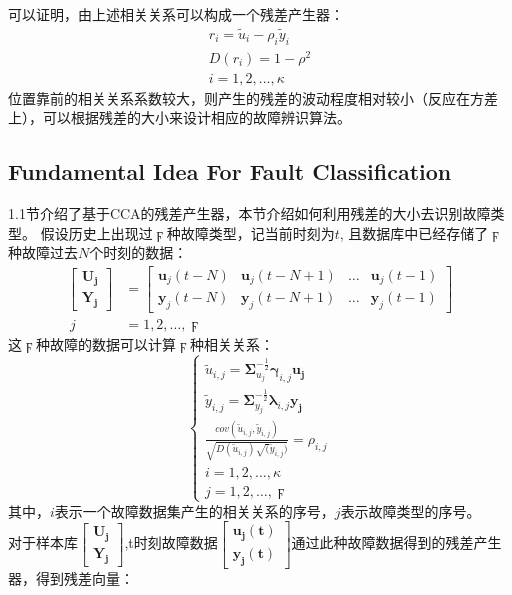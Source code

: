 \documentclass[lang=cn,11pt,a4paper]{elegantpaper}
\begin{document}
可以证明，由上述相关关系可以构成一个残差产生器：
\begin{equation}
	\begin{aligned}
	r_i = \tilde{u}_i-\rho_i\tilde{y}_i\\
	D(r_i)=1-\rho^2\\
	i = 1,2,\ldots,\kappa
	\end{aligned}
\end{equation}
位置靠前的相关关系系数较大，则产生的残差的波动程度相对较小（反应在方差上），可以根据残差的大小来设计相应的故障辨识算法。
\subsection{Fundamental Idea For Fault Classification}
1.1节介绍了基于CCA的残差产生器，本节介绍如何利用残差的大小去识别故障类型。
假设历史上出现过$\digamma$种故障类型，记当前时刻为$t$, 且数据库中已经存储了$\digamma$种故障过去$N$个时刻的数据：
\begin{equation}
	\begin{aligned}
		\left[\begin{array}{c}
			\boldsymbol{U_j}\\
			\boldsymbol{Y_j}
		\end{array}\right] &= \left[\begin{array}{cccc}
		\boldsymbol{u}_j(t-N)& \boldsymbol{u}_j(t-N+1) & \ldots & \boldsymbol{u}_j(t-1) \\
		\boldsymbol{y}_j(t-N)&  \boldsymbol{y}_j(t-N+1)& \ldots & \boldsymbol{y}_j(t-1) 
	\end{array}\right]\\\
	j &= 1,2,\ldots,\digamma
	\end{aligned}
\end{equation}
这$\digamma$种故障的数据可以计算$\digamma$种相关关系：
\begin{equation}
	\begin{cases}
		\tilde{u}_{i,j}=\boldsymbol{\Sigma}_{u_j}^{-\frac{1}{2}}\boldsymbol{\gamma}_{i,j}\boldsymbol{u_j}\\
		\tilde{y}_{i,j}=\boldsymbol{\Sigma}_{y_j}^{-\frac{1}{2}}\boldsymbol{\lambda}_{i,j}\boldsymbol{y_j}\\
		\frac{cov(\tilde{u}_{i,j},\tilde{y}_{i,j})}{\sqrt{D(\tilde{u}_{i,j})\sqrt(\tilde{y}_{i,j})}}=\rho_{i,j}\\
		i = 1,2,\ldots,\kappa\\
		j = 1,2,\ldots,\digamma
	\end{cases}
\end{equation}
其中，$i$表示一个故障数据集产生的相关关系的序号，$j$表示故障类型的序号。\\对于样本库$\left[\begin{array}{c}
	\boldsymbol{U_j}\\
	\boldsymbol{Y_j}
\end{array}\right]$,t时刻故障数据$\left[\begin{array}{c}
\boldsymbol{u_j(t)}\\
\boldsymbol{y_j(t)}
\end{array}\right]$通过此种故障数据得到的残差产生器，得到残差向量：
\end{document}
